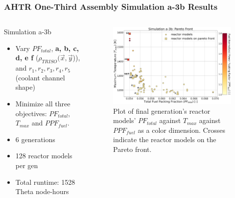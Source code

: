 \begin{frame}
    \frametitle{AHTR One-Third Assembly Simulation a-3b Results}
    \begin{columns}
    \begin{column}{0.35\textwidth}
        \begin{block}{Simulation a-3b}
            \begin{itemize}
            \item Vary $PF_{total}$, \textbf{a, b, c, d, e f} ($\rho_{TRISO}(\vec{x}, 
            \vec{y}$)), and $r_1, r_2, r_3, r_4, r_5$ (coolant channel shape) 
            \item Minimize all three objectives: $PF_{total}$, $T_{max}$ and $PPF_{fuel}$.
            \item 6 generations 
            \item 128 reactor models per gen 
            \item Total runtime: 1528 Theta node-hours 
            \end{itemize}
            \end{block}
        \end{column}
    \begin{column}{0.7\textwidth}
    \begin{figure}
        \includegraphics[width=\linewidth]{../docs/figures/assem-obj-3-all-2d.png} 
        \caption{Plot of final generation's reactor models' 
        $PF_{total}$ against $T_{max}$ against $PPF_{fuel}$ as a color dimension. 
        Crosses indicate the reactor models on the Pareto front.}
    \end{figure}
    \end{column}
\end{columns}
\end{frame}

